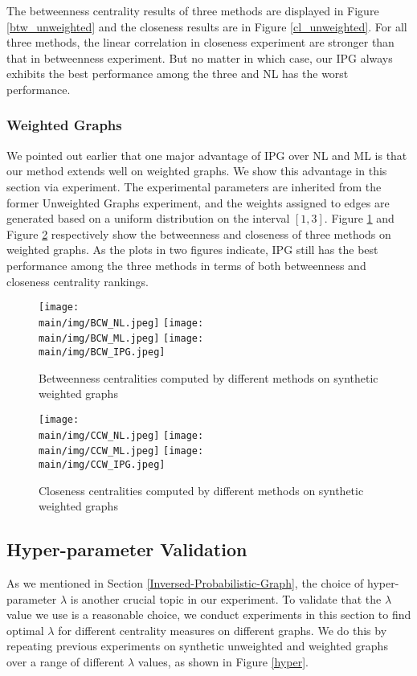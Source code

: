 \documentclass[\main/thesis.tex]{subfiles}
\begin{document}
The betweenness centrality results of three methods are displayed in Figure \ref{btw_unweighted} and the closeness results are in Figure \ref{cl_unweighted}. For all three methods, the linear correlation in closeness experiment are stronger than that in betweenness experiment. But no matter in which case, our IPG always exhibits the best performance among the three and NL has the worst performance.

\subsubsection{Weighted Graphs}
We pointed out earlier that one major advantage of IPG over NL and ML is that our method extends well on weighted graphs. We show this advantage in this section via experiment. The experimental parameters are inherited from the former Unweighted Graphs experiment, and the weights assigned to edges are generated based on a uniform distribution on the interval $[1,3]$. Figure \ref{btw_weighted} and Figure \ref{cl_weighted} respectively show the betweenness and closeness of three methods on weighted graphs. As the plots in two figures indicate, IPG still has the best performance among the three methods in terms of both betweenness and closeness centrality rankings.

\begin{figure}
\texttt{[image: \\main/img/BCW\_NL.jpeg]}
\texttt{[image: \\main/img/BCW\_ML.jpeg]}
\centering
\texttt{[image: \\main/img/BCW\_IPG.jpeg]}
\caption{Betweenness centralities computed by different methods on synthetic weighted graphs}
\label{btw_weighted}
\end{figure}


\begin{figure}
\texttt{[image: \\main/img/CCW\_NL.jpeg]}
\texttt{[image: \\main/img/CCW\_ML.jpeg]}
\centering
\texttt{[image: \\main/img/CCW\_IPG.jpeg]}
\caption{Closeness centralities computed by different methods on synthetic weighted graphs}
\label{cl_weighted}
\end{figure}


\subsection{Hyper-parameter Validation} \label{Hyper-Parameter-Validation}
As we mentioned in Section \ref{Inversed-Probabilistic-Graph}, the choice of hyper-parameter $\lambda$ is another crucial topic in our experiment. To validate that the $\lambda$ value we use is a reasonable choice, we conduct experiments in this section to find optimal $\lambda$ for different centrality measures on different graphs. We do this by repeating previous experiments on synthetic unweighted and weighted graphs over a range of different $\lambda$ values, as shown in Figure \ref{hyper}.
\end{document}
